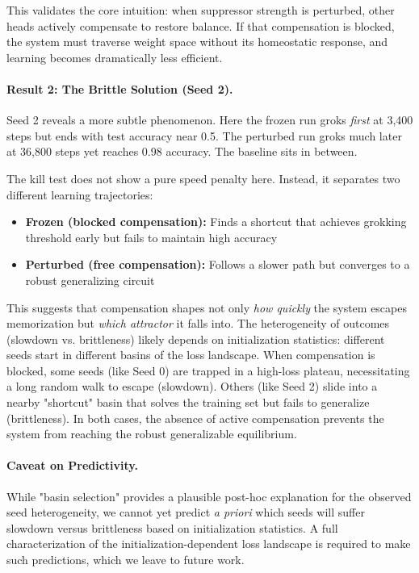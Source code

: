 This validates the core intuition: when suppressor strength is perturbed, other heads actively compensate to restore balance. If that compensation is blocked, the system must traverse weight space without its homeostatic response, and learning becomes dramatically less efficient.

\paragraph{Result 2: The Brittle Solution (Seed 2).}
Seed 2 reveals a more subtle phenomenon. Here the frozen run groks \emph{first} at 3,400 steps but ends with test accuracy near 0.5. The perturbed run groks much later at 36,800 steps yet reaches 0.98 accuracy. The baseline sits in between.

The kill test does not show a pure speed penalty here. Instead, it separates two different learning trajectories:
\begin{itemize}
\item \textbf{Frozen (blocked compensation):} Finds a shortcut that achieves grokking threshold early but fails to maintain high accuracy
\item \textbf{Perturbed (free compensation):} Follows a slower path but converges to a robust generalizing circuit
\end{itemize}

This suggests that compensation shapes not only \emph{how quickly} the system escapes memorization but \emph{which attractor} it falls into. The heterogeneity of outcomes (slowdown vs. brittleness) likely depends on initialization statistics: different seeds start in different basins of the loss landscape. When compensation is blocked, some seeds (like Seed 0) are trapped in a high-loss plateau, necessitating a long random walk to escape (slowdown). Others (like Seed 2) slide into a nearby "shortcut" basin that solves the training set but fails to generalize (brittleness). In both cases, the absence of active compensation prevents the system from reaching the robust generalizable equilibrium.

\paragraph{Caveat on Predictivity.}
While "basin selection" provides a plausible post-hoc explanation for the observed seed heterogeneity, we cannot yet predict \emph{a priori} which seeds will suffer slowdown versus brittleness based on initialization statistics. A full characterization of the initialization-dependent loss landscape is required to make such predictions, which we leave to future work.

